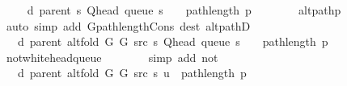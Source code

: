 \begin{isabellebody}
\ \isamarkupfalse%
\ {\isachardoublequoteopen}{\isachardot}{\kern0pt}{\isachardot}{\kern0pt}{\isachardot}{\kern0pt}\ {\isacharequal}{\kern0pt}\ d\ {\isacharparenleft}{\kern0pt}parent\ s{\isacharparenright}{\kern0pt}\ {\isacharparenleft}{\kern0pt}Q{\isacharunderscore}{\kern0pt}head\ {\isacharparenleft}{\kern0pt}queue\ s{\isacharparenright}{\kern0pt}{\isacharparenright}{\kern0pt}\ {\isacharplus}{\kern0pt}\ {}\ {\isacharplus}{\kern0pt}\ path{\isacharunderscore}{\kern0pt}length\ p{\isachardoublequoteclose}\isanewline
\ \ \ \ \ \ \isamarkupfalse%
\ alt{\isacharunderscore}{\kern0pt}path{\isacharunderscore}{\kern0pt}p\isanewline
\ \ \ \ \ \ \isamarkupfalse%
\ {\isacharparenleft}{\kern0pt}auto\ simp\ add{\isacharcolon}{\kern0pt}\ G{\isachardot}{\kern0pt}path{\isacharunderscore}{\kern0pt}length{\isacharunderscore}{\kern0pt}Cons\ dest{\isacharcolon}{\kern0pt}\ alt{\isacharunderscore}{\kern0pt}pathD{\isacharparenleft}{\kern0pt}{}{\isacharparenright}{\kern0pt}{\isacharparenright}{\kern0pt}\isanewline
\ \ \ \ \isamarkupfalse%
\ \isamarkupfalse%
\ {\isachardoublequoteopen}{\isachardot}{\kern0pt}{\isachardot}{\kern0pt}{\isachardot}{\kern0pt}\ {\isacharequal}{\kern0pt}\ d\ {\isacharparenleft}{\kern0pt}parent\ {\isacharparenleft}{\kern0pt}alt{\isacharunderscore}{\kern0pt}fold\ G{}\ G{}\ src\ s{\isacharparenright}{\kern0pt}{\isacharparenright}{\kern0pt}\ {\isacharparenleft}{\kern0pt}Q{\isacharunderscore}{\kern0pt}head\ {\isacharparenleft}{\kern0pt}queue\ s{\isacharparenright}{\kern0pt}{\isacharparenright}{\kern0pt}\ {\isacharplus}{\kern0pt}\ {}\ {\isacharplus}{\kern0pt}\ path{\isacharunderscore}{\kern0pt}length\ p{\isachardoublequoteclose}\isanewline
\ \ \ \ \ \ \isamarkupfalse%
\ not{\isacharunderscore}{\kern0pt}white{\isacharunderscore}{\kern0pt}head{\isacharunderscore}{\kern0pt}queue\isanewline
\ \ \ \ \ \ \isamarkupfalse%
\ {\isacharparenleft}{\kern0pt}simp\ add{\isacharcolon}{\kern0pt}\ not{\isacharunderscore}{\kern0pt}{\isacharparenleft}{\kern0pt}{}{\isacharparenright}{\kern0pt}{\isacharparenright}{\kern0pt}\isanewline
\ \ \ \ \isamarkupfalse%
\ \isamarkupfalse%
\ {\isachardoublequoteopen}{\isachardot}{\kern0pt}{\isachardot}{\kern0pt}{\isachardot}{\kern0pt}\ {\isacharequal}{\kern0pt}\ d\ {\isacharparenleft}{\kern0pt}parent\ {\isacharparenleft}{\kern0pt}alt{\isacharunderscore}{\kern0pt}fold\ G{}\ G{}\ src\ s{\isacharparenright}{\kern0pt}{\isacharparenright}{\kern0pt}\ u\ {\isacharplus}{\kern0pt}\ path{\isacharunderscore}{\kern0pt}length\ p{\isachardoublequoteclose}\isanewline

\end{isabellebody}
